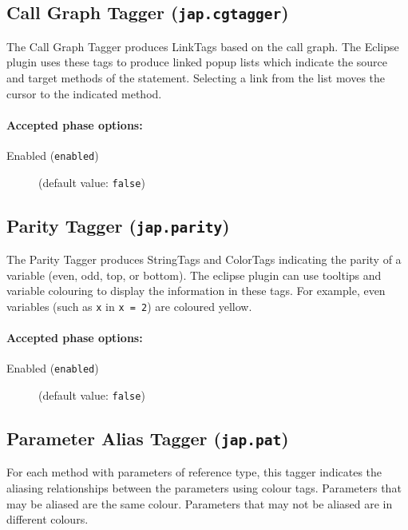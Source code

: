 \documentclass{article}
\begin{document}
\subsection{Call Graph Tagger ({\tt jap.cgtagger})}

The Call Graph Tagger produces LinkTags based on the call
graph. The Eclipse plugin uses these tags to produce
linked popup lists which indicate the source and target methods
of the statement. Selecting a link from the list moves the
cursor to the indicated method.


\paragraph{Accepted phase options:} 

\begin{description}

\item[Enabled ({\tt enabled})]
(default value: {\tt false})






\end{description}

\subsection{Parity Tagger ({\tt jap.parity})}

The Parity Tagger produces StringTags and ColorTags indicating
the parity of a variable (even, odd, top, or bottom).  The eclipse
plugin can use tooltips and variable colouring to display the
information in these tags.  For example, even variables (such as
{\tt x} in {\tt x = 2}) are coloured yellow.


\paragraph{Accepted phase options:} 

\begin{description}

\item[Enabled ({\tt enabled})]
(default value: {\tt false})






\end{description}

\subsection{Parameter Alias Tagger ({\tt jap.pat})}
For each method with parameters of reference type, this tagger indicates the aliasing relationships between the parameters using colour tags. Parameters that may be aliased are the same colour. Parameters that may not be aliased are in different colours.
\end{document}
